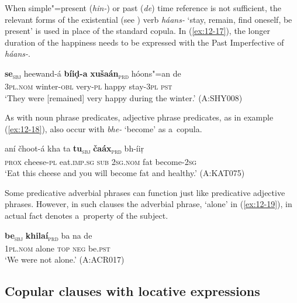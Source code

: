 When simple"=present (\textit{hin-}) or past (\textit{de}) time reference is not sufficient, the relevant forms of the existential (see ) verb \textit{háans-} `stay, remain, find oneself, be present' is used in place of the standard copula. In (\ref{ex:12-17}), the longer duration of the happiness needs to be expressed with the Past Imperfective of \textit{háans-}.

\begin{exe}
\ex
\label{ex:12-17}
\gll {\ob}\textbf{se}{\cb}\textsubscript{\textsc{\upshape sbj}} heewand-á {\ob}\textbf{bíiḍ-a} \textbf{xušaán}{\cb}\textsubscript{\textsc{\upshape prd}} hóons"=an de \\
\textsc{3pl.nom} winter-\textsc{obl} very-\textsc{pl} happy stay-\textsc{3pl} \textsc{pst} \\
\glt `They were [remained] very happy during the winter.' (A:SHY008)
\end{exe}

As with noun phrase predicates, adjective phrase predicates, as in example (\ref{ex:12-18}), also occur with \textit{bhe-} `become' as a~copula.

\begin{exe}
\ex
\label{ex:12-18}
\gll aní čhoot-á kha ta {\ob}\textbf{tu}{\cb}\textsubscript{\textsc{\upshape sbj}} {\ob}\textbf{čaáx}{\cb}\textsubscript{\textsc{\upshape prd}} bh-íiṛ \\
\textsc{prox} cheese-\textsc{pl} eat.\textsc{imp.sg} \textsc{sub} \textsc{2sg.nom} fat become-\textsc{2sg} \\
\glt `Eat this cheese and you will become fat and healthy.' (A:KAT075)
\end{exe}

Some predicative adverbial phrases can function just like predicative adjective phrases. However, in such clauses the adverbial phrase, `alone' in (\ref{ex:12-19}), in actual fact denotes a~property of the subject.

\begin{exe}
\ex
\label{ex:12-19}
\gll {\ob}\textbf{be}{\cb}\textsubscript{\textsc{\upshape sbj}} {\ob}\textbf{khilaí}{\cb}\textsubscript{\textsc{\upshape prd}} ba na de \\
\textsc{1pl.nom} alone \textsc{top} \textsc{neg} be.\textsc{pst} \\
\glt `We were not alone.' (A:ACR017)
\end{exe}


\subsection{Copular clauses with locative expressions}
\label{subsec:12-1-3}

